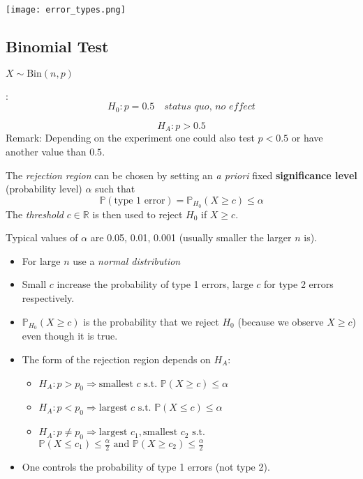 \renewcommand{\arraystretch}{1}
\setlength\tabcolsep{\oldtabcolsep}

\begin{center}
    \texttt{[image: error\_types.png]}
\end{center}

\subsection{Binomial Test}
$X\sim \mathrm{Bin}(n,p)$

:
\noindent\begin{equation*}
    H_0: p=0.5\quad \textit{status quo, no effect}
\end{equation*}

\noindent\begin{equation*}
    H_A: p>0.5
\end{equation*}
Remark: Depending on the experiment one could also test $p<0.5$ or have another value than $0.5$.


The \textit{rejection region} can be chosen by setting an \textit{a priori} fixed \textbf{significance level} (probability level) $\alpha$ such that
\noindent\begin{equation*}
    \mathbb{P}(\text{type 1 error}) = \mathbb{P}_{H_0}(X\geq c) \leq \alpha
\end{equation*}
The \textit{threshold} $c\in \mathbb{R}$ is then used to reject $H_0$ if $X\geq c$.

Typical values of $\alpha$ are 0.05, 0.01, 0.001 (usually smaller the larger $n$ is).

\newpar{}
\begin{itemize}
    \item For large $n$ use a \textit{normal distribution}
    \item Small $c$ increase the probability of type 1 errors, large $c$ for type 2 errors respectively.
    \item $\mathbb{P}_{H_0}(X\geq c)$ is the probability that we reject $H_0$ (because we observe $X\geq c$) even though it is true.
    \item The form of the rejection region depends on $H_A$:
          \begin{itemize}
              \item $H_A: p>p_0 \Rightarrow \text{smallest }c\text{ s.t. } \mathbb{P}(X\geq c)\leq \alpha$
              \item $H_A: p<p_0 \Rightarrow \text{largest }c\text{ s.t. } \mathbb{P}(X\leq c)\leq \alpha$
              \item $H_A: p\neq p_0 \Rightarrow \text{largest } c_1, \text{smallest }c_2 \text{ s.t.}$\newline
                    $ \mathbb{P}(X\leq c_1)\leq \frac{\alpha}{2} \text{ and }\mathbb{P}(X\geq c_2)\leq \frac{\alpha}{2}$
          \end{itemize}
    \item One controls the probability of type 1 errors (not type 2).
\end{itemize}

